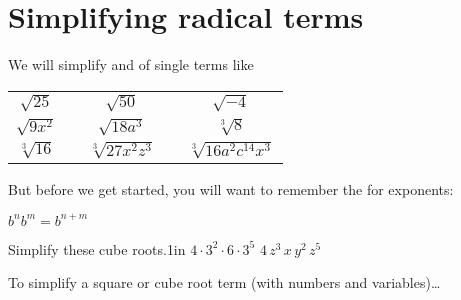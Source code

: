 \section*{Simplifying radical terms}

We will simplify  and  of single terms like
\begin{center}
    \large
    \renewcommand{\arraystretch}{1.75}
    \begin{tabular}{ccccc}
        $\sqrt{25}$ & \hspace{1in} & $\sqrt{50}$ & \hspace{1in} & $\sqrt{-4}$\\
        $\sqrt{9x^2}$ & \hspace{1in} & $\sqrt{18a^3}$ & \hspace{1in} & $\sqrt[3]{8}$\\
        $\sqrt[3]{16}$ & \hspace{1in} & $\sqrt[3]{27x^2z^3}$ & \hspace{1in} & $\sqrt[3]{16a^2c^{14}x^3}$\\
    \end{tabular}
\end{center}



But before we get started, you will want to remember the  for exponents:
\begin{myCenteredBox}[width=2in]
    \LARGE
    $ b^n b^m = b^{n+m} $
\end{myCenteredBox}

\begin{myProblems2}{Simplify these cube roots.}{1in}
    {
        $4 \cdot 3^2 \cdot 6 \cdot 3^5$ 
    }
    {
        $4 \, z^3 \, x \, y^2 \, z^5$ 
    }
\end{myProblems2}
\vfill
\begin{myConceptSteps}{
    To simplify a square or cube root term (with numbers and variables)\dots
}
\end{myConceptSteps}

